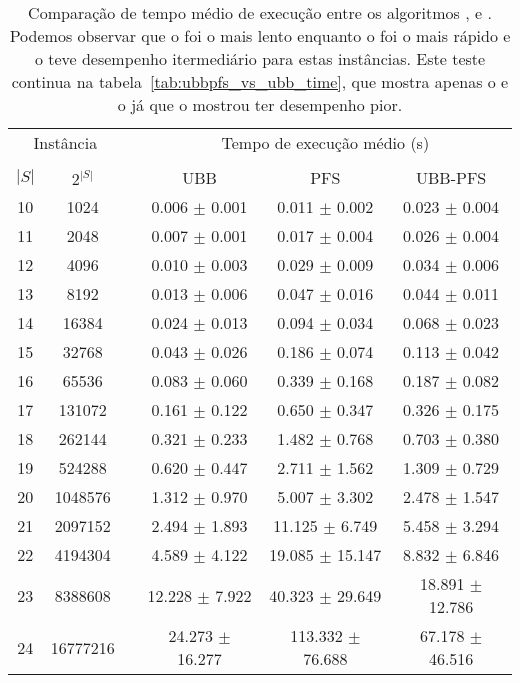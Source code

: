 \begin{table}
\centering
\footnotesize
\caption{Comparação de tempo médio de execução entre os algoritmos
,  e . Podemos observar que
o  foi o mais lento enquanto o  foi o mais
rápido e o  teve desempenho itermediário para estas
instâncias. Este teste continua na tabela~\ref{tab:ubbpfs_vs_ubb_time},
que mostra apenas o  e o  já que o 
 mostrou ter desempenho pior.}
\label{tab:ubbpfs_vs_ubb_vs_pfs_time}
\begin{tabular}{cc c ccc}
\toprule
\multicolumn{2}{c}{Instância} & \phantom{} & \multicolumn{3}{c}{Tempo de execução médio (s)}\\
\cline{1-2}\cline{4-6}\\
$|S|$ & $2^{|S|}$ && UBB & PFS & UBB-PFS  \\
10 &    1024 &&  0.006 $\pm$ 0.001 & 0.011 $\pm$ 0.002 & 0.023 $\pm$ 0.004 \\
11 &    2048 &&  0.007 $\pm$ 0.001 & 0.017 $\pm$ 0.004 & 0.026 $\pm$ 0.004 \\
12 &    4096 &&  0.010 $\pm$ 0.003 & 0.029 $\pm$ 0.009 & 0.034 $\pm$ 0.006 \\
13 &    8192 &&  0.013 $\pm$ 0.006 & 0.047 $\pm$ 0.016 & 0.044 $\pm$ 0.011 \\
14 &   16384 &&  0.024 $\pm$ 0.013 & 0.094 $\pm$ 0.034 & 0.068 $\pm$ 0.023 \\
15 &   32768 &&  0.043 $\pm$ 0.026 & 0.186 $\pm$ 0.074 & 0.113 $\pm$ 0.042 \\
16 &   65536 &&  0.083 $\pm$ 0.060 & 0.339 $\pm$ 0.168 & 0.187 $\pm$ 0.082 \\
17 &  131072 &&  0.161 $\pm$ 0.122 & 0.650 $\pm$ 0.347 & 0.326 $\pm$ 0.175 \\
18 &  262144 &&  0.321 $\pm$ 0.233 & 1.482 $\pm$ 0.768 & 0.703 $\pm$ 0.380 \\
19 &  524288 &&  0.620 $\pm$ 0.447 & 2.711 $\pm$ 1.562 & 1.309 $\pm$ 0.729 \\
20 & 1048576 &&  1.312 $\pm$ 0.970 & 5.007 $\pm$ 3.302 & 2.478 $\pm$ 1.547 \\
21 & 2097152 &&  2.494 $\pm$ 1.893 & 11.125 $\pm$ 6.749 & 5.458 $\pm$ 3.294 \\
22 & 4194304 &&  4.589 $\pm$ 4.122 & 19.085 $\pm$ 15.147 & 8.832 $\pm$ 6.846 \\
23 & 8388608 &&  12.228 $\pm$ 7.922 & 40.323 $\pm$ 29.649 & 18.891 $\pm$ 12.786 \\
24 & 16777216 &&  24.273 $\pm$ 16.277 & 113.332 $\pm$ 76.688 & 67.178 $\pm$ 46.516 \\
\bottomrule
\end{tabular}
\end{table}

